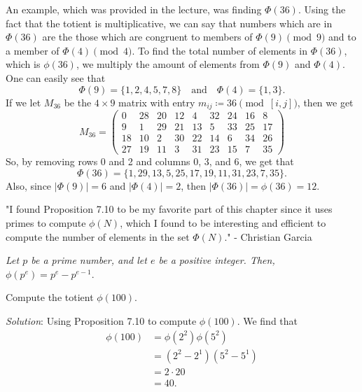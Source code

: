 \documentclass[12pt]{article}
\newenvironment{problem}[2][Problem]{\begin{trivlist}
\item[\hskip \labelsep {\bfseries #1}\hskip \labelsep {\bfseries #2}]}{\end{trivlist}}
\newenvironment{proposition}[2][Proposition]{\begin{trivlist}
\item[\hskip \labelsep {\bfseries #1}\hskip \labelsep {\bfseries #2}]}{\end{trivlist}}
\begin{document}
\vspace{1em}

An example, which was provided in the lecture, was finding $\Phi(36)$. Using the fact that the totient is multiplicative, we can say that numbers which are in $\Phi(36)$ are the those which are congruent to members of $\Phi(9) \pmod{9}$ and to a member of $\Phi(4) \pmod{4}$. To find the total number of elements in $\Phi(36)$, which is $\phi(36)$, we multiply the amount of elements from $\Phi(9)$ and $\Phi(4)$. One can easily see that $$\Phi(9) = \{1,2,4,5,7,8\} \hspace{1em} \text{and} \hspace{1em} \Phi(4) = \{1,3\}.$$ If we let $M_{36}$ be the $4 \times 9$ matrix with entry $m_{ij} \coloneqq 36 \pmod{[i,j]}$, then we get $$M_{36} = \begin{pmatrix}
0 & 28 & 20 & 12 & 4 & 32 & 24 & 16 & 8 \\
9 & 1 & 29 & 21 & 13 & 5 & 33 & 25 & 17 \\
18 & 10 & 2 & 30 & 22 & 14 & 6 & 34 & 26 \\
27 & 19 & 11 & 3 & 31 & 23 & 15 & 7 & 35
\end{pmatrix}$$
So, by removing rows 0 and 2 and columns 0, 3, and 6, we get that $$\Phi(36) = \{1,29,13,5,25,17,19,11,31,23,7,35\}.$$
Also, since $\left| \Phi(9) \right| = 6$ and $\left| \Phi(4) \right| = 2$, then $\left| \Phi(36) \right| = \phi(36) = 12$.

\vspace{1em}

"I found Proposition 7.10 to be my favorite part of this chapter since it uses primes to compute $\phi(N)$, which I found to be interesting and efficient to compute the number of elements in the set $\Phi(N)$." - Christian Garcia



\begin{proposition}{7.10}
\textit{Let $p$ be a prime number, and let $e$ be a positive integer. Then, $\phi(p^e) = p^e - p^{e-1}$}.
\end{proposition}

\begin{problem}{7.11} Compute the totient $\phi(100)$.

\hspace{1em} \textit{Solution}: Using Proposition 7.10 to compute $\phi(100)$. We find that 
\begin{align*}
    \phi(100) &= \phi(2^2)\phi(5^2) \tag*{(By multiplicity of $\phi$)} \\ &= (2^2 - 2^1)(5^2 - 5^1) \tag*{(By Proposition 7.10)} \\ &= 2 \cdot 20 \\ &= 40. 
\end{align*}
\end{problem}
\end{document}
